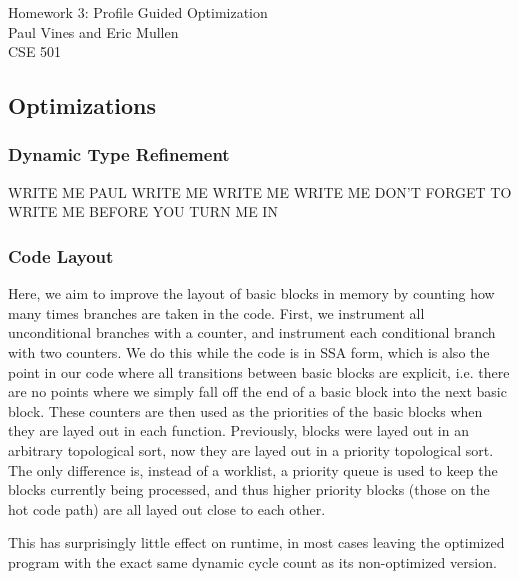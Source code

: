 \documentclass[12pt,letterpaper]{article}
\begin{document}
\begin{flushright}
Homework 3: Profile Guided Optimization\\
Paul Vines and Eric Mullen\\
CSE 501\\
\end{flushright}

\subsection*{Optimizations}
\subsubsection*{Dynamic Type Refinement}
WRITE ME PAUL WRITE ME WRITE ME WRITE ME DON'T FORGET TO WRITE ME BEFORE YOU TURN ME IN
\subsubsection*{Code Layout}
Here, we aim to improve the layout of basic blocks in memory by
counting how many times branches are taken in the code. First, we
instrument all unconditional branches with a counter, and instrument
each conditional branch with two counters. We do this while the code
is in SSA form, which is also the point in our code where all
transitions between basic blocks are explicit, i.e. there are no
points where we simply fall off the end of a basic block into the next
basic block. These counters are then used as the priorities of the
basic blocks when they are layed out in each function. Previously,
blocks were layed out in an arbitrary topological sort, now they are
layed out in a priority topological sort. The only difference is,
instead of a worklist, a priority queue is used to keep the blocks
currently being processed, and thus higher priority blocks (those on
the hot code path) are all layed out close to each other.

This has surprisingly little effect on runtime, in most cases leaving
the optimized program with the exact same dynamic cycle count as its
non-optimized version.
\end{document}

